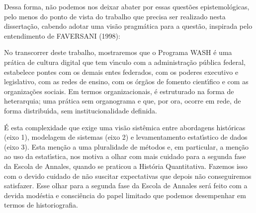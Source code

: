 \documentclass[
12pt,		%
openright,	%
twoside,  %
a4paper,			%
chapter=TITLE,		%
english,			%
french,				%
spanish,			%
brazil				%
]{USPSC-classe/USPSC}
\begin{document}
Dessa forma, n\~ao podemos nos deixar abater por essas quest\~oes epistemol\'ogicas, pelo menos do ponto de vista do trabalho que precisa ser realizado nesta disserta\c{c}\~ao, cabendo adotar uma vis\~ao pragm\'atica para a quest\~ao, inspirada pelo entendimento de FAVERSANI (1998):











\noindent\begin{center}\mbox{\centering{}}\end{center}


No transcorrer deste trabalho, mostraremos que o Programa WASH \'e uma pr\'atica de cultura digital que tem v\'{\i}nculo com a administra\c{c}\~ao p\'ublica federal, estabelece pontes com os demais entes federados, com os poderes executivo e legislativo, com as redes de ensino, com os \'org\~aos de fomento cient\'{\i}fico e com as organiza\c{c}\~oes sociais. Em termos organizacionais, \'e estruturado na forma de heterarquia; uma pr\'atica sem organograma e que, por ora, ocorre em rede, de forma distribu\'{\i}da, sem institucionalidade definida.










\'E esta complexidade que exige uma vis\~ao sist\^emica entre abordagens hist\'oricas (eixo 1), modelagem de sistemas (eixo 2) e levamentamento estat\'{\i}stico de dados (eixo 3). Esta men\c{c}\~ao a uma pluralidade de m\'etodos e, em particular, a men\c{c}\~ao ao uso da estat\'{\i}stica, nos motiva a olhar com mais cuidado para a segunda fase da Escola de Annales, quando se praticou a \textquotedbl Hist\'oria Quantitativa\textquotedbl . Fazemos isso com o devido cuidado de n\~ao suscitar expectativas que depois n\~ao conseguiremos satisfazer. Esse olhar para a segunda fase da Escola de Annales ser\'a feito com a devida mod\'estia e consci\^encia do papel limitado que podemos desempenhar em termos de historiografia.
\end{document}
